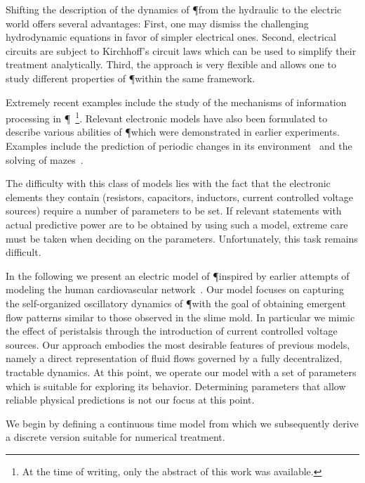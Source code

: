   Shifting the description of the dynamics of \P from the hydraulic to the electric world offers several advantages: First, one may dismiss the challenging hydrodynamic equations in favor of simpler electrical ones. Second, electrical circuits are subject to Kirchhoff's circuit laws which can be used to simplify their treatment analytically. Third, the approach is very flexible and allows one to study different properties of \P within the same framework. 

  Extremely recent examples include the study of the mechanisms of information processing in \P~\cite{tagung2017}\footnote{At the time of writing, only the abstract of this work was available.}. Relevant electronic models have also been formulated to describe various abilities of \P which were demonstrated in earlier experiments. Examples include the prediction of periodic changes in its environment~\cite{pershin2009memristive} and the solving of mazes~\cite{ntinas2016oscillation}.

  The difficulty with this class of models lies with the fact that the electronic elements they contain (resistors, capacitors, inductors, current controlled voltage sources) require a number of parameters to be set. If relevant statements with actual predictive power are to be obtained by using such a model, extreme care must be taken when deciding on the parameters. Unfortunately, this task remains difficult.

  In the following we present an electric model of \P inspired by earlier attempts of modeling the human cardiovascular network~\cite{stefanovska1999physics,dePater1964}. Our model focuses on capturing the self-organized oscillatory dynamics of \P with the goal of obtaining emergent flow patterns similar to those observed in the slime mold. In particular we mimic the effect of peristalsis through the introduction of current controlled voltage sources. Our approach embodies the most desirable features of previous models, namely a direct representation of fluid flows governed by a fully decentralized, tractable dynamics. 
  At this point, we operate our model with a set of parameters which is suitable for exploring its behavior. Determining parameters that allow reliable physical predictions is not our focus at this point.

  We begin by defining a continuous time model from which we subsequently derive a discrete version suitable for numerical treatment.
